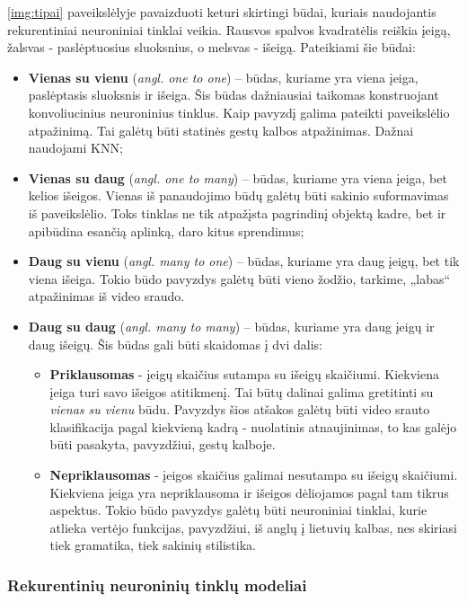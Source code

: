 \documentclass{VUMIFPSbakalaurinis}
\begin{document}
\ref{img:tipai} paveikslėlyje pavaizduoti keturi skirtingi būdai, kuriais naudojantis rekurentiniai neuroniniai tinklai veikia. Rausvos spalvos kvadratėlis reiškia įeigą, žalsvas - paslėptuosius sluoksnius, o melsvas - išeigą. Pateikiami šie būdai:

\begin{itemize}
	\item \textbf{Vienas su vienu} (\textit{angl. one to one}) – būdas, kuriame yra viena įeiga, paslėptasis sluoksnis ir išeiga. Šis būdas dažniausiai taikomas konstruojant konvoliucinius neuroninius tinklus. Kaip pavyzdį galima pateikti paveikslėlio atpažinimą. Tai galėtų būti statinės gestų kalbos atpažinimas. Dažnai naudojami KNN;
	\item \textbf{Vienas su daug} (\textit{angl. one to many}) – būdas, kuriame yra viena įeiga, bet kelios išeigos. Vienas iš panaudojimo būdų galėtų būti sakinio suformavimas iš paveikslėlio. Toks tinklas ne tik atpažįsta pagrindinį objektą kadre, bet ir apibūdina esančią aplinką, daro kitus sprendimus;
	\item \textbf{Daug su vienu} (\textit{angl. many to one}) – būdas, kuriame yra daug įeigų, bet tik viena išeiga. Tokio būdo pavyzdys galėtų būti vieno žodžio, tarkime, „labas“ atpažinimas iš video sraudo.
	\item \textbf{Daug su daug} (\textit{angl. many to many}) – būdas, kuriame yra daug įeigų ir daug išeigų. Šis būdas gali būti skaidomas į dvi dalis:
	\begin{itemize}
		\item \textbf{Priklausomas} - įeigų skaičius sutampa su išeigų skaičiumi. Kiekviena įeiga turi savo išeigos atitikmenį. Tai būtų dalinai galima gretitinti su \textit{vienas su vienu} būdu. Pavyzdys šios atšakos galėtų būti video srauto klasifikacija pagal kiekvieną kadrą - nuolatinis atnaujinimas, to kas galėjo būti pasakyta, pavyzdžiui, gestų kalboje.
		\item \textbf{Nepriklausomas} - įeigos skaičius galimai nesutampa su išeigų skaičiumi. Kiekviena įeiga yra nepriklausoma ir išeigos dėliojamos pagal tam tikrus aspektus. Tokio būdo pavyzdys galėtų būti neuroniniai tinklai, kurie atlieka vertėjo funkcijas, pavyzdžiui, iš anglų į lietuvių kalbas, nes skiriasi tiek gramatika, tiek sakinių stilistika.
	\end{itemize}
\end{itemize}

\subsubsection{Rekurentinių neuroninių tinklų modeliai}
\end{document}
